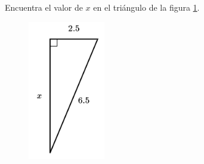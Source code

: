\question[15]  Encuentra el valor de $x$ en el triángulo de la figura \ref{fig:lados_pitagoras_29}.
\begin{figure}[H]
    \begin{center}
        \includegraphics[width=0.3\textwidth]{../images/lados_pitagoras_29.png}
    \end{center}
    \caption{}
    \label{fig:lados_pitagoras_29}
\end{figure}